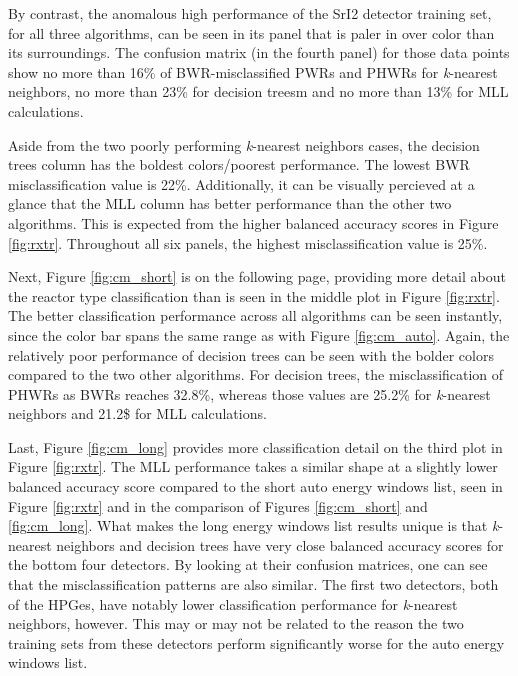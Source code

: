 By contrast, the anomalous high performance of the \gls{SrI2} detector training
set, for all three algorithms, can be seen in its panel that is paler in over
color than its surroundings.  The confusion matrix (in the fourth panel) for
those data points show no more than 16\% of \gls{BWR}-misclassified \gls{PWR}s
and \gls{PHWR}s for \textit{k}-nearest neighbors, no more than 23\% for
decision treesm and no more than 13\% for \gls{MLL} calculations. 

Aside from the two poorly performing \textit{k}-nearest neighbors cases, the
decision trees column has the boldest colors/poorest performance.  The lowest
\gls{BWR} misclassification value is 22\%.  Additionally, it can be visually
percieved at a glance that the \gls{MLL} column has better performance than the
other two algorithms. This is expected from the higher balanced accuracy scores
in Figure \ref{fig:rxtr}.  Throughout all six panels, the highest
misclassification value is 25\%.

Next, Figure \ref{fig:cm_short} is on the following page, providing more detail
about the reactor type classification than is seen in the middle plot in Figure
\ref{fig:rxtr}.  The better classification performance across all algorithms
can be seen instantly, since the color bar spans the same range as with Figure
\ref{fig:cm_auto}. Again, the relatively poor performance of decision trees can
be seen with the bolder colors compared to the two other algorithms. For
decision trees, the misclassification of \gls{PHWR}s as \gls{BWR}s reaches
32.8\%, whereas those values are 25.2\% for \textit{k}-nearest neighbors and
21.2\$ for \gls{MLL} calculations.

Last, Figure \ref{fig:cm_long} provides more classification detail on the third
plot in Figure \ref{fig:rxtr}. The \gls{MLL} performance takes a similar shape
at a slightly lower balanced accuracy score compared to the short auto energy
windows list, seen in Figure \ref{fig:rxtr} and in the comparison of Figures
\ref{fig:cm_short} and \ref{fig:cm_long}. What makes the long energy windows
list results unique is that \textit{k}-nearest neighbors and decision trees
have very close balanced accuracy scores for the bottom four detectors. By
looking at their confusion matrices, one can see that the misclassification
patterns are also similar. The first two detectors, both of the \gls{HPGe}s,
have notably lower classification performance for \textit{k}-nearest neighbors,
however. This may or may not be related to the reason the two training sets
from these detectors perform significantly worse for the auto energy windows
list. 

